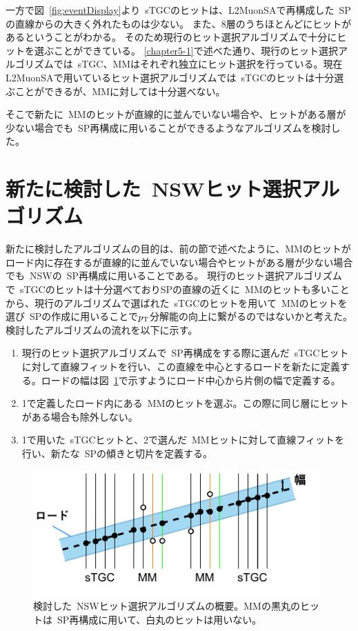 一方で図~\ref{fig:eventDisplay}より~sTGCのヒットは、L2MuonSAで再構成した~SPの直線からの大きく外れたものは少ない。
また、8層のうちほとんどにヒットがあるということがわかる。
そのため現行のヒット選択アルゴリズムで十分にヒットを選ぶことができている。
\ref{chapter5-1}で述べた通り、現行のヒット選択アルゴリズムでは~sTGC、MMはそれぞれ独立にヒット選択を行っている。現在L2MuonSAで用いているヒット選択アルゴリズムでは~sTGCのヒットは十分選ぶことができるが、MMに対しては十分選べない。

そこで新たに~MMのヒットが直線的に並んでいない場合や、ヒットがある層が少ない場合でも~SP再構成に用いることができるようなアルゴリズムを検討した。

\section{新たに検討した~NSWヒット選択アルゴリズム}\label{chapter5-4}
新たに検討したアルゴリズムの目的は、前の節で述べたように、MMのヒットがロード内に存在するが直線的に並んでいない場合やヒットがある層が少ない場合でも~NSWの~SP再構成に用いることである。
現行のヒット選択アルゴリズムで~sTGCのヒットは十分選べておりSPの直線の近くに~MMのヒットも多いことから、現行のアルゴリズムで選ばれた~sTGCのヒットを用いて~MMのヒットを選び~SPの作成に用いることで$p_\mathrm{T}$分解能の向上に繋がるのではないかと考えた。
検討したアルゴリズムの流れを以下に示す。

\begin{enumerate}
    \item 現行のヒット選択アルゴリズムで~SP再構成をする際に選んだ~sTGCヒットに対して直線フィットを行い、この直線を中心とするロードを新たに定義する。ロードの幅は図~\ref{fig:newSelectlg}で示すようにロード中心から片側の幅で定義する。
    \item 1で定義したロード内にある~MMのヒットを選ぶ。この際に同じ層にヒットがある場合も除外しない。
    \item 1で用いた~sTGCヒットと、2で選んだ~MMヒットに対して直線フィットを行い、新たな~SPの傾きと切片を定義する。
\end{enumerate}


\begin{figure}[h]
    \centering
    \includegraphics[clip, width=11cm]{fig/5/newHitSelectAlg.pdf}
    \caption{検討した~NSWヒット選択アルゴリズムの概要。MMの黒丸のヒットは~SP再構成に用いて、白丸のヒットは用いない。}
    \label{fig:newSelectlg}
\end{figure}


